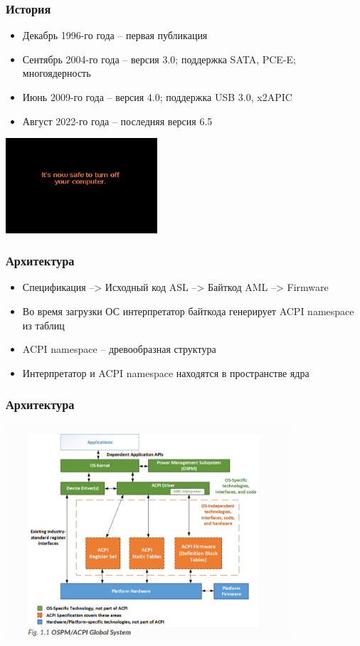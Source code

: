 \documentclass{beamer}
\begin{document}
\begin{frame}
	\frametitle{История}
	\begin{itemize}
		\item Декабрь 1996-го года -- первая публикация
		\item Сентябрь 2004-го года -- версия 3.0; поддержка SATA, PCE-E; многоядерность
		\item Июнь 2009-го года -- версия 4.0; поддержка USB 3.0, x2APIC
		\item Август 2022-го года -- последняя версия 6.5
	\end{itemize}
	\hspace{86pt}
	\includegraphics[width=160pt]{pictures/trouble2.jpg}
\end{frame}

\begin{frame}
	\frametitle{Архитектура}
	\begin{itemize}
		\item Спецификация --> Исходный код ASL --> Байткод AML --> Firmware
		\item Во время загрузки ОС интерпретатор байткода генерирует ACPI namespace из таблиц
		\item ACPI namespace -- древообразная структура
		\item Интерпретатор и ACPI namespace находятся в пространстве ядра
	\end{itemize}
\end{frame}

\begin{frame}
	\frametitle{Архитектура}
	\hspace{18pt}
	\includegraphics[width=300pt]{pictures/arch_acpi1.jpg}
\end{frame}
\end{document}
